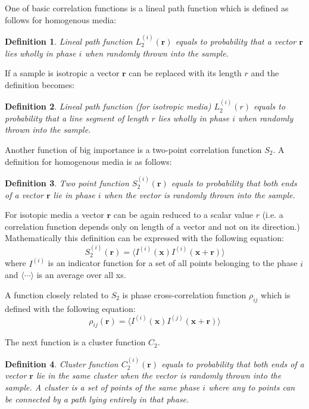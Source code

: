 \documentclass[reprint,amsmath,amssymb,aps,pre,showkeys,showpacs,nofootinbib]{revtex4-1}
\newtheorem{definition}{Definition}
\begin{document}
One of basic correlation functions is a lineal path function which is defined as
follows for homogenous media:
\begin{definition}
  Lineal path function $L_2^{(i)}(\bm{r})$ equals to probability that a
  vector $\bm{r}$ lies wholly in phase $i$ when randomly thrown into the
  sample.
\end{definition}
If a sample is isotropic a vector $\bm{r}$ can be replaced with its length
$r$ and the definition becomes:
\begin{definition}
  Lineal path function (for isotropic media) $L_2^{(i)}(r)$ equals to
  probability that a line segment of length $r$ lies wholly in phase $i$ when
  randomly thrown into the sample.
\end{definition}

Another function of big importance is a two-point correlation function $S_2$. A
definition for homogenous media is as follows:
\begin{definition}
  Two point function $S_2^{(i)}(\bm{r})$ equals to probability that both ends
  of a vector $\bm{r}$ lie in phase $i$ when the vector is randomly thrown
  into the sample.
\end{definition}
For isotopic media a vector $\bm{r}$ can be again reduced to a scalar value
$r$ (i.e. a correlation function depends only on length of a vector and not on
its direction.) Mathematically this definition can be expressed with the
following equation:
\begin{equation}
  S_2^{(i)}(\bm{r}) = \langle I^{(i)}(\bm{x}) I^{(i)}(\bm{x} +
  \bm{r}) \rangle
  \label{eq:s2-def}
\end{equation}
where $I^{(i)}$ is an indicator function for a set of all points belonging to
the phase $i$ and $\langle \cdots \rangle$ is an average over all xs.

A function closely related to $S_2$ is phase cross-correlation function
$\rho_{ij}$ which is defined with the following equation:
\begin{equation}
  \rho_{ij}(\bm{r}) = \langle I^{(i)}(\bm{x}) I^{(j)}(\bm{x} +
  \bm{r}) \rangle
  \label{eq:cross-def}
\end{equation}

The next function is a cluster function $C_2$.
\begin{definition}
  Cluster function $C_2^{(i)}(\bm{r})$ equals to probability that both
  ends of a vector $\bm{r}$ lie in the same cluster when the vector is
  randomly thrown into the sample. A cluster is a set of points of the same
  phase $i$ where any to points can be connected by a path lying entirely in
  that phase.
\end{definition}
\end{document}

